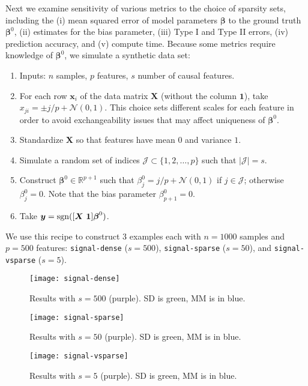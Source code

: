 \documentclass[11pt]{article}
\def\sgn{\mathop{\rm sgn}\nolimits}
\newcommand{\bx}{\boldsymbol{x}}
\newcommand{\by}{\boldsymbol{y}}
\newcommand{\bX}{\boldsymbol{X}}
\newcommand{\bbeta}{\boldsymbol{\beta}}
\begin{document}
Next we examine sensitivity of various metrics to the choice of sparsity sets, including the (i) mean squared error of model parameters $\bbeta$ to the ground truth $\bbeta^{0}$, (ii) estimates for the bias parameter, (iii) Type I and Type II errors, (iv) prediction accuracy, and (v) compute time.
Because some metrics require knowledge of $\bbeta^{0}$, we simulate a synthetic data set:
\begin{enumerate}
    \item Inputs: $n$ samples, $p$ features, $s$ number of causal features.
    \item For each row $\bx_{i}$ of the data matrix $\bX$ (without the column $\boldsymbol{1}$), take $x_{ji} = \pm j/p + \mathcal{N}(0,1)$. This choice sets different scales for each feature in order to avoid exchangeability issues that may affect uniqueness of $\bbeta^{0}$.
    \item Standardize $\bX$ so that features have mean $0$ and variance $1$.
    \item Simulate a random set of indices $\mathcal{J} \subset \{1,2,\ldots,p\}$ such that $|\mathcal{J}| = s$.
    \item Construct $\bbeta^{0} \in \mathbb{R}^{p+1}$ such that $\beta_{j}^{0} = j/p + \mathcal{N}(0,1)$ if $j \in \mathcal{J}$; otherwise $\beta_{j}^{0} = 0$. Note that the bias parameter $\beta_{p+1}^{0} = 0$.
    \item Take $\by = \sgn([\bX~\boldsymbol{1}] \bbeta^{0})$.
\end{enumerate}
We use this recipe to construct 3 examples each with $n = 1000$ samples and $p = 500$ features: \texttt{signal-dense} ($s=500$), \texttt{signal-sparse} ($s=50$), and \texttt{signal-vsparse} ($s=5$).
\begin{figure}[!ht]
    \centering
    \texttt{[image: signal-dense]}
    \caption{
        Results with $s = 500$ (purple).
        SD is green, MM is in blue.
    }
\end{figure}
\begin{figure}[!ht]
    \centering
    \texttt{[image: signal-sparse]}
    \caption{
        Results with $s = 50$ (purple).
        SD is green, MM is in blue.
    }
\end{figure}
\begin{figure}[!ht]
    \centering
    \texttt{[image: signal-vsparse]}
    \caption{
        Results with $s = 5$ (purple).
        SD is green, MM is in blue.
    }
\end{figure}
\end{document}
